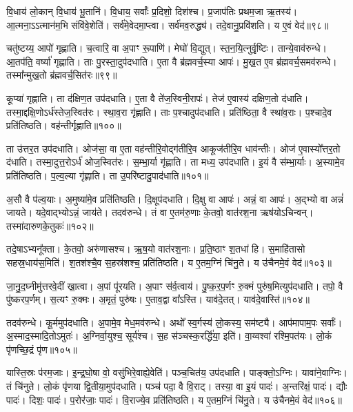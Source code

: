 वि॒धाय॑ लो॒कान्‌ वि॒धाय॑ भू॒तानि॑। वि॒धाय॒ सर्वाः᳚ प्र॒दिशो॒ दिश॑श्च। 
प्र॒जाप॑तिः प्रथम॒जा ऋ॒तस्य॑। आ॒त्मना॒ऽऽत्मान॑म॒भि संवि॑वे॒शेति॑। 
सर्व॑मे॒वेदमा॒प्त्वा। सर्व॑मव॒रुद्ध्य॑। 
तदे॒वानु॒प्रवि॑शति। य ए॒वं वेद॑॥९८॥\anuvakamend


चतु॑ष्टय्य॒ आपो॑ गृह्णाति। च॒त्वारि॒ वा अ॒पाꣳ रू॒पाणि॑। 
मेघो॑ वि॒द्युत्। स्त॒न॒यि॒त्नुर्वृ॒ष्टिः। तान्ये॒वाव॑रुन्धे। 
आ॒तप॑ति॒ वर्ष्या॑ गृह्णाति। ताः पु॒रस्ता॒दुप॑दधाति। 
ए॒ता वै ब्र॑ह्मवर्च॒स्या आपः॑। मु॒ख॒त ए॒व ब्र॑ह्मवर्च॒समव॑रुन्धे। 
तस्मा᳚न्मुख॒तो ब्र॑ह्मवर्च॒सित॑रः॥९९॥


कूप्या॑ गृह्णाति। ता द॑क्षिण॒त उप॑दधाति। 
ए॒ता वै ते॑ज॒स्विनी॒रापः॑। तेज॑ ए॒वास्य॑ दक्षिण॒तो द॑धाति। 
तस्मा॒द्दक्षि॒णोऽर्ध॑स्तेज॒स्वित॑रः। स्था॒व॒रा गृ॑ह्णाति। 
ताः प॒श्चादुप॑दधाति। प्रति॑ष्ठिता॒ वै स्था॑व॒राः। 
प॒श्चादे॒व प्रति॑तिष्ठति। वह॑न्तीर्गृह्णाति॥१००॥


ता उ॑त्तर॒त उप॑दधाति। ओज॑सा॒ वा ए॒ता वह॑न्तीरि॒वोद्ग॑तीरि॒व आकूज॑तीरि॒व धाव॑न्तीः। 
ओज॑ ए॒वास्यो᳚त्तर॒तो द॑धाति। तस्मा॒दुत्त॒रोऽर्ध॑ ओज॒स्वित॑रः। 
स॒म्भा॒र्या गृ॑ह्णाति। ता मध्य॒ उप॑दधाति। 
इ॒यं वै स॑म्भा॒र्याः। अ॒स्यामे॒व प्रति॑तिष्ठति। 
प॒ल्व॒ल्या गृ॑ह्णाति। ता उ॒परि॑ष्टादु॒पाद॑धाति॥१०१॥


अ॒सौ वै प॑ल्व॒याः। अ॒मुष्या॑मे॒व प्रति॑तिष्ठति। 
दि॒क्षूप॑दधाति। दि॒क्षु वा आपः॑। 
अन्नं॒ वा आपः॑। अ॒द्भ्यो वा अन्नं॑ जायते। 
यदे॒वाद्भ्योऽन्नं॒ जाय॑ते। तदव॑रुन्धे। 
तं वा ए॒तम॑रु॒णाः के॒तवो॒ वात॑रश॒ना ऋष॑योऽचिन्वन्। 
तस्मा॑दारुणके॒तुकः॑॥१०२॥


तदे॒षाऽभ्यनू᳚क्ता। के॒तवो॒ अरु॑णासश्च। 
ऋ॒ष॒यो वात॑रश॒नाः। प्र॒ति॒ष्ठाꣳ श॒तधा॑ हि। 
स॒माहि॑तासो सहस्र॒धाय॑स॒मिति॑। श॒तश॑श्चै॒व स॒हस्र॑शश्च॒ प्रति॑तिष्ठति। 
य ए॒तम॒ग्निं चि॑नु॒ते। य उ॑चैनमे॒वं वेद॑॥१०३॥\anuvakamend


जा॒नु॒द॒घ्नीमु॑त्तरवे॒दीं खा॒त्वा। अ॒पां पू॑रयति। 
अ॒पाꣳ स॑र्व॒त्वाय॑। पु॒ष्क॒र॒प॒र्णꣳ रु॒क्मं पुरु॑ष॒मित्युप॑दधाति। 
तपो॒ वै पु॑ष्करप॒र्णम्। स॒त्यꣳ रु॒क्मः। 
अ॒मृतं॒ पुरु॑षः। ए॒ताव॒द्वा वा᳚ऽस्ति। 
याव॑दे॒तत्। याव॑दे॒वास्ति॑॥१०४॥


तदव॑रुन्धे। कू॒र्ममुप॑दधाति। 
अ॒पामे॒व मेध॒मव॑रुन्धे। अथो᳚ स्व॒र्गस्य॑ लो॒कस्य॒ सम॑ष्ट्यै। 
आप॑मापाम॒पः सर्वाः᳚। अ॒स्मा\-द॒स्मा\-दि॒तो\-ऽमुतः॑। 
अ॒ग्निर्वा॒युश्च॒ सूर्य॑श्च। स॒ह स॑ञ्चस्क॒रर्द्धि॑या॒ इति॑। 
वा॒य्वश्वा॑ रश्मि॒पत॑यः। लो॒कं पृ॑णच्छि॒द्रं पृ॑ण॥१०५॥


यास्ति॒स्रः प॑रम॒जाः। इ॒न्द्र॒घो॒षा वो॒ वसु॑भिरे॒वाह्ये॒वेति॑। 
पञ्च॒चित॑य॒ उप॑दधाति। पाङ्क्तो॒ऽग्निः। 
यावा॑ने॒वाग्निः। तं चि॑नुते। 
लो॒कं पृ॑णया द्वि॒तीया॒मुप॑दधाति। पञ्च॑ पदा॒ वै वि॒राट्। 
तस्या॒ वा इ॒यं पादः॑। अ॒न्तरि॑क्षं॒ पादः॑। द्यौः पादः॑। 
दिशः॒ पादः॑। प॒रोर॑जाः॒ पादः॑। वि॒राज्ये॒व प्रति॑तिष्ठति। 
य ए॒तम॒ग्निं चि॑नु॒ते। य उ॑चैनमे॒वं वेद॑॥१०६॥\anuvakamend


